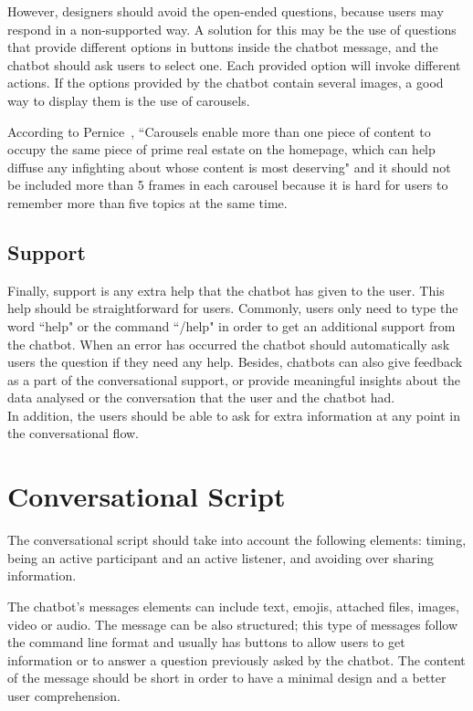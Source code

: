 \documentclass[a4paper,10pt]{article}
\begin{document}
However, designers should avoid the open-ended questions, because users may respond in a non-supported way. A solution for this may be the use of questions that provide different options in buttons inside the chatbot message, and the chatbot should ask users to select one. Each provided option will invoke different actions. If the options provided by the chatbot contain several images, a good way to display them is the use of carousels. 

According to Pernice~\cite{carousel}, ``Carousels enable more than one piece of content to occupy the same piece of prime real estate on the homepage, which can help diffuse any infighting about whose content is most deserving" and it should not be included more than 5 frames in each carousel because it is hard for users to remember more than five topics at the same time. 


\subsection{Support}
Finally, support is any extra help that the chatbot has given to the user. This help should be straightforward for users. Commonly, users only need to type the word ``help" or the command ``/help" in order to get an additional support from the chatbot. When an error has occurred the chatbot should automatically ask users the question if they need any help. Besides, chatbots can also give feedback as a part of the conversational support, or provide meaningful insights about the data analysed or the conversation that the user and the chatbot had.\\[0\baselineskip] In addition, the users should be able to ask for extra information at any point in the conversational flow.

\section{Conversational Script}
The conversational script should take into account the following elements: timing, being an active participant and an active listener, and avoiding over sharing information.

The chatbot's messages elements can include text, emojis, attached files, images, video or audio. The message can be also structured; this type of messages follow the command line format and usually has buttons to allow users to get information or to answer a question previously asked by the chatbot. The content of the message should be short in order to have a minimal design and a better user comprehension.  %
\end{document}
